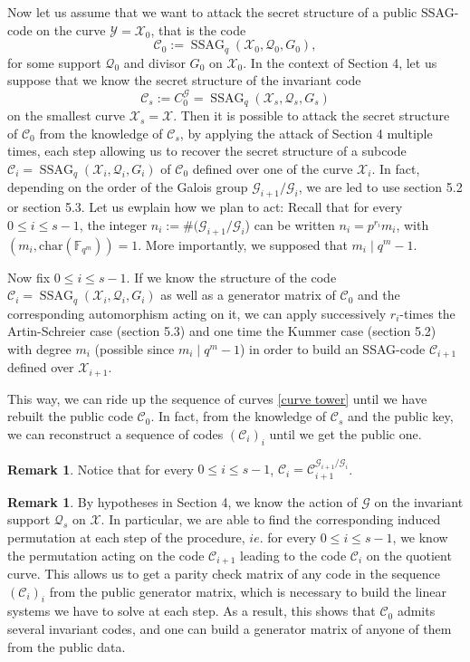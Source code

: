 \documentclass[10pt]{article}
\theoremstyle{definition}
\newtheorem{rq1}[thm]{Remark}
\theoremstyle{definition}
\theoremstyle{definition}
\newcommand{\s}{\vspace{0.3cm}}
\newcommand{\C}{\mathcal{C}}
\newcommand{\fqm}{\mathbb{F}_{q^m}}
\newcommand{\X}{\mathcal{X}}
\newcommand{\Y}{\mathcal{Y}}
\newcommand{\QR}{\mathcal{Q}}
\newcommand{\G}{\mathcal{G}}
\newcommand{\ssag}{\operatorname{SSAG}}
\begin{document}
Now let us assume that we want to attack the secret structure of a public SSAG-code on the curve $\Y=\X_0$, that is the code 
\[\C_0 := \ssag_q(\X_0,\QR_0,G_0),\]
for some support $\QR_0$ and divisor $G_0$ on $\X_0$. In the context of Section 4, let us suppose that we know the secret structure of the invariant code 
\[\C_s:= C_0^{\G} = \ssag_q(\X_s,\QR_s,G_s)\]
on the smallest curve $\X_s=\X$. Then it is possible to attack the secret structure of $\C_0$ from the knowledge of $\C_s$, by applying the attack of Section 4 multiple times, each step allowing us to recover the secret structure of a subcode $\C_i=\ssag_q(\X_i,\QR_i,G_i)$ of $\C_0$ defined over one of the curve $\X_i$. In fact, depending on the order of the Galois group $\G_{i+1}/\G_i$, we are led to use section 5.2 or section 5.3. 
\color{purple} Let us ewplain how we plan to act: Recall that for every $0 \leq i \leq s-1$, the integer $n_i:= \#(\G_{i+1}/\G_i$) can be written $n_i = p^{r_i}m_i$, with $(m_i,\mathrm{char}(\fqm))=1$. More importantly, we supposed that $m_i \mid q^m-1$. \color{black}
\s

Now fix $0 \leq i \leq s-1$. If we know the structure of the code $\C_i = \ssag_q(\X_i,\QR_i,G_i)$ as well as a generator matrix of $\C_0$ and the corresponding automorphism acting on it, we can apply successively $r_i$-times the Artin-Schreier case (section 5.3) and one time the Kummer case (section 5.2) with degree $m_i$ (possible since $m_i \mid q^m-1$) in order to build an SSAG-code $\C_{i+1}$ defined over $\X_{i+1}$. 

This way, we can ride up the sequence of curves \eqref{curve tower} until we have rebuilt the public code $\C_0$. In fact, from the knowledge of $\C_s$ and the public key, we can reconstruct a sequence of codes $(\C_i)_i$ until we get the public one. 



\begin{rq1}
Notice that for every $0 \leq i \leq s-1$, $\C_i = \C_{i+1}^{\G_{i+1}/\G_i}$. 
\end{rq1}


\begin{rq1} \label{induced permutation} By hypotheses in Section 4, we know the action of $\G$ on the invariant support $\QR_s$ on $\X$. In particular, we are able to find the corresponding induced permutation at each step of the procedure, $\mathit{ie.}$ for every $0 \leq i \leq s-1$, we know the permutation acting on the code $\C_{i+1}$ leading to the code $\C_i$ on the quotient curve. This allows us to get a parity check matrix of any code in the sequence $(\C_i)_i$ from the public generator matrix, which is necessary to build the linear systems we have to solve at each step. As a result, this shows that $\C_0$ admits several invariant codes, and one can build a generator matrix of anyone of them from the public data.
\end{rq1}
\end{document}
